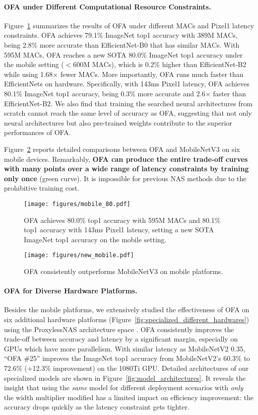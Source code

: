 \documentclass{article} \usepackage{iclr2020_conference,times}
\newcommand{\myparagraph}[1]{\vspace{-3pt}\paragraph{#1}}
\begin{document}
\myparagraph{OFA under Different Computational Resource Constraints.} Figure~\ref{fig:mobile_80} summarizes the results of OFA under different MACs and Pixel1 latency constraints. OFA achieves 79.1\% ImageNet top1 accuracy with 389M MACs, being 2.8\% more accurate than EfficientNet-B0 that has similar MACs. With 595M MACs, OFA reaches a new SOTA 80.0\% ImageNet top1 accuracy under the mobile setting ($<$600M MACs), which is 0.2\% higher than EfficientNet-B2 while using 1.68$\times$ fewer MACs. More importantly, OFA runs much faster than EfficientNets on hardware. Specifically, with 143ms Pixel1 latency, OFA achieves 80.1\% ImageNet top1 accuracy, being 0.3\% more accurate and 2.6$\times$ faster than EfficientNet-B2. We also find that training the searched neural architectures from scratch cannot reach the same level of accuracy as OFA, suggesting that not only neural architectures but also pre-trained weights contribute to the superior performances of OFA. 

Figure~\ref{fig:new_mobile} reports detailed comparisons between OFA and MobileNetV3 on six mobile devices. Remarkably, \textbf{OFA can produce the entire trade-off curves with many points over a wide range of latency constraints by training only once} (green curve). It is impossible for previous NAS methods \citep{tan2018mnasnet,cai2019proxylessnas} due to the prohibitive training cost. 

\begin{figure}[t]
    \centering
    \vspace{-20pt}
    \texttt{[image: figures/mobile\_80.pdf]}
    \caption{OFA achieves 80.0\% top1 accuracy with 595M MACs and 80.1\% top1 accuracy with 143ms Pixel1 latency, setting a new SOTA ImageNet top1 accuracy on the mobile setting.}
    \label{fig:mobile_80}
\end{figure}

\begin{figure}[t]
    \centering
    \texttt{[image: figures/new\_mobile.pdf]}
    \caption{OFA consistently outperforms MobileNetV3 on mobile platforms.}
    \label{fig:new_mobile}
\end{figure}

\myparagraph{OFA for Diverse Hardware Platforms.}
Besides the mobile platforms, we extensively studied the effectiveness of OFA on six additional hardware platforms (Figure~\ref{fig:specialized_different_hardwares}) using the ProxylessNAS architecture space \citep{cai2019proxylessnas}.
OFA consistently improves the trade-off between accuracy and latency by a significant margin, especially on GPUs which have more parallelism. With similar latency as MobileNetV2 0.35, ``OFA \#25'' improves the ImageNet top1 accuracy from MobileNetV2's 60.3\% to 72.6\% (+12.3\% improvement) on the 1080Ti GPU. Detailed architectures of our specialized models are shown in Figure~\ref{fig:model_architectures}. 
It reveals the insight that using the \textit{same} model for different deployment scenarios with \textit{only} the width multiplier modified has a limited impact on efficiency improvement: the accuracy drops quickly as the latency constraint gets tighter. 
\end{document}
